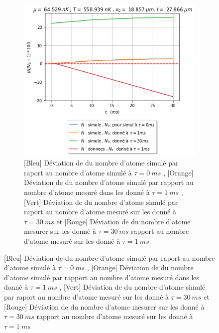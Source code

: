 \documentclass[a3, 10pt,twoside]{article}          %
\theoremstyle{plain}
\theoremstyle{definition}
\theoremstyle{remark}
\theoremstyle{definition} %
\def\OliveGreen{OliveGreen}
\begin{document}
\begin{figure}[H]
\begin{subfigure}[b]{0.45\textwidth}
        		\includegraphics[width=\textwidth]{Figures/Nat-1.1.png}
        		\caption{{\color{blue}[Bleu] Déviation de du nombre d'atome simulé par raport au nombre d'atome simulé à $\tau = 0 ~ms$ } , {\color{orange}[Orange] Déviation de du nombre d'atome simulé par rapport au nombre d'atome mesuré dans les donné à $\tau = 1 ~ms$} ,  {\color{\OliveGreen}[Vert] Déviation de du nombre d'atome simulé par raport au nombre d'atome mesuré sur les donné à $\tau = 30 ~ms$} et {\color{red}[Rouge] Déviation de du nombre d'atome mesurer sur les donné à $\tau = 30 ~ms$ rapport au nombre d'atome mesuré sur les donné à $\tau = 1 ~ms$} }
        		\label{fig1.1:nat}
    		\end{subfigure}
				
		\end{figure}
		
\end{document}
